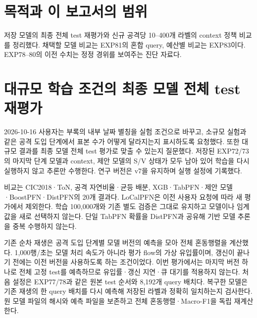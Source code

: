 




\section*{목적과 이 보고서의 범위}

저장 모델의 최종 전체 test 재평가와 신규 공격당 10–400개 라벨의 context 정책 비교를 정리했다. 채택할 모델 비교는 EXP81의 혼합 query, 예산별 비교는 EXP83이다. EXP78–80의 이전 수치는 정정 경위를 보여주는 진단 자료다.


\section{대규모 학습 조건의 최종 모델 전체 test 재평가}
2026-10-16 사용자는 부록의 내부 날짜 별칭을 실험 조건으로 바꾸고, 소규모 실험과 같은 공격 도입 단계에서 표본 수가 어떻게 달라지는지 표시하도록 요청했다. 또한 대규모 결과를 최종 모델 전체 test 평가로 맞출 수 있는지 질문했다. 저장된 EXP72/\allowbreak{}73의 마지막 단계 모델과 context, 제안 모델의 S/\allowbreak{}V 상태가 모두 남아 있어 학습을 다시 실행하지 않고 추론만 수행한다. 연구 버전은 v7을 유지하며 실행 설정에 기록했다.

비교는 CIC2018·ToN, 공격 자연비율·균등 배분, XGB·TabPFN·제안 모델·BoostPFN·DistPFN의 20개 결과다. LoCalPFN은 이전 사용자 요청에 따라 새 평가에서 제외한다. 학습 100,000개와 기존 별도 검증은 그대로 유지하고 모델이나 임계값을 새로 선택하지 않는다. 단일 TabPFN 확률을 DistPFN과 공유해 기반 모델 추론을 중복 수행하지 않는다.

기존 순차 재생은 공격 도입 단계별 모델 버전의 예측을 모아 전체 혼동행렬을 계산했다. 1,000행/\allowbreak{}초는 모델 처리 속도가 아니라 평가 flow의 가상 유입률이며, 갱신이 끝나기 전에는 이전 버전을 사용하도록 하는 조건이었다. 이번 평가에서는 마지막 버전 하나로 전체 고정 test를 예측하므로 유입률·갱신 지연·큐 대기를 적용하지 않는다. 처음 설정은 EXP77/\allowbreak{}78과 같은 원본 test 순서와 8,192개 query 배치다. 복구한 모델은 기존 재생의 한 query 배치를 다시 예측해 저장된 라벨과 정확히 일치하는지 검사한다. 원 모델 파일의 해시와 예측 파일을 보존하고 전체 혼동행렬·Macro-F1을 독립 재계산한다.

